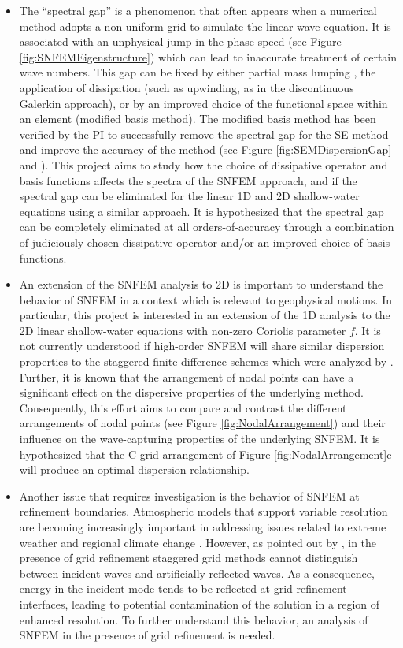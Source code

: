\documentclass[11pt]{article}
\begin{document}
\begin{itemize}
\item The ``spectral gap'' is a phenomenon that often appears when a numerical method adopts a non-uniform grid to simulate the linear wave equation.  It is associated with an unphysical jump in the phase speed (see Figure \ref{fig:SNFEMEigenstructure}) which can lead to inaccurate treatment of certain wave numbers.  This gap can be fixed by either partial mass lumping \citep{ASMTCC2012QJRMS}, the application of dissipation (such as upwinding, as in the discontinuous Galerkin approach), or by an improved choice of the functional space within an element (modified basis method).  The modified basis method has been verified by the PI to successfully remove the spectral gap for the SE method and improve the accuracy of the method (see Figure \ref{fig:SEMDispersionGap} and \cite{PAU2013QJRMS}).  This project aims to study how the choice of dissipative operator and basis functions affects the spectra of the SNFEM approach, and if the spectral gap can be eliminated for the linear 1D and 2D shallow-water equations using a similar approach.  It is hypothesized that the spectral gap can be completely eliminated at all orders-of-accuracy through a combination of judiciously chosen dissipative operator and/or an improved choice of basis functions.

\item An extension of the SNFEM analysis to 2D is important to understand the behavior of SNFEM in a context which is relevant to geophysical motions.  In particular, this project is interested in an extension of the 1D analysis to the 2D linear shallow-water equations with non-zero Coriolis parameter $f$.  It is not currently understood if high-order SNFEM will share similar dispersion properties to the staggered finite-difference schemes which were analyzed by \cite{DAR1994MWR}.  Further, it is known that the arrangement of nodal points can have a significant effect on the dispersive properties of the underlying method.  Consequently, this effort aims to compare and contrast the different arrangements of nodal points (see Figure \ref{fig:NodalArrangement}) and their influence on the wave-capturing properties of the underlying SNFEM.  It is hypothesized that the C-grid arrangement of Figure \ref{fig:NodalArrangement}c will produce an optimal dispersion relationship.

\item Another issue that requires investigation is the behavior of SNFEM at refinement boundaries.  Atmospheric models that support variable resolution are becoming increasingly important in addressing issues related to extreme weather and regional climate change \citep{WCSJBKMGDLDFSHPTDR2012MWR}.  However, as pointed out by \cite{PAUCJ2011JCP}, in the presence of grid refinement staggered grid methods cannot distinguish between incident waves and artificially reflected waves.  As a consequence, energy in the incident mode tends to be reflected at grid refinement interfaces, leading to potential contamination of the solution in a region of enhanced resolution.  To further understand this behavior, an analysis of SNFEM in the presence of grid refinement is needed.
\end{itemize}
\end{document}
